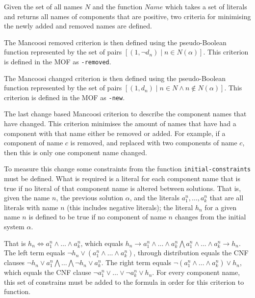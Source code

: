 
Given the set of all names $N$ and the function $Name$ which takes a set of literals and returns all names of components that are positive,
two criteria for minimising the newly added and removed names are defined.
\begin{defs}
The Mancoosi removed criterion is then defined using the pseudo-Boolean function
represented by the set of pairs $[(1,\neg d_n) \mid n \in N(\alpha)]$.
This criterion is defined in the MOF as \verb+-removed+.
\end{defs}

\begin{defs}
The Mancoosi changed criterion is then defined using the pseudo-Boolean function
 represented by the set of pairs $[(1,d_n) \mid n \in N \wedge n \not \in N(\alpha)]$.
This criterion is defined in the MOF as \verb+-new+.
\end{defs}

The last change based Mancoosi criterion to describe the component names that have changed.
This criterion minimises the amount of names that have had a component with that name either be removed or added.
For example, if a component of name $c$ is removed, and replaced with two components of name $c$, then this is only one component name changed.

To measure this change some constraints from the function \verb+initial-constraints+ must be defined.
What is required is a literal for each component name that is true if no literal of that component name is altered between solutions.
That is, given the name $n$, the previous solution $\alpha$, and the literals $a^n_1, \ldots , a^n_k$ that are all literals with name $n$ (this includes negative literals);
the literal $h_n$ for a given name $n$ is defined to be true if no component of name $n$ changes from the initial system $\alpha$.

That is $h_n \Leftrightarrow a^n_1 \wedge \ldots \wedge a^n_k$, 
which equals $h_n \rightarrow a^n_1 \wedge \ldots \wedge a^n_k \bigwedge a^n_1 \wedge \ldots \wedge a^n_k \rightarrow h_n$.
The left term equals $\neg h_n  \vee (a^n_1 \wedge \ldots \wedge a^n_k)$,
through distribution equals the CNF clauses $\neg h_n \vee a^n_1 \bigwedge \ldots \bigwedge \neg h_n \vee a^n_k$.
The right term equals $\neg(a^n_1 \wedge \ldots \wedge a^n_k) \vee h_n$,
which equals the CNF clause $\neg a^n_1 \vee \ldots \vee \neg a^n_k \vee h_n$.
For every component name, this set of constrains must be added to the formula in order for this criterion to function.

